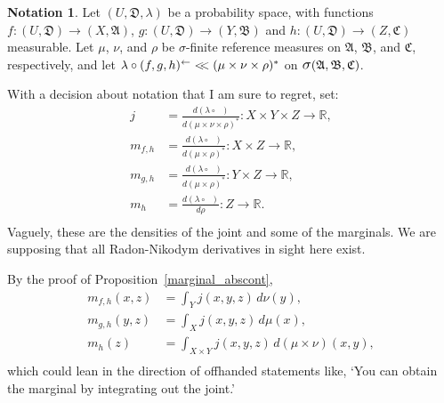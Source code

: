 \documentclass[
twoside=true,
paper=letter,
fontsize=9pt,
pagesize=auto,
leqno,
openany,
headsepline,
overfullrule,
]{scrbook}
\theoremstyle{plain}
\theoremstyle{plain}
\theoremstyle{definition}
\newtheorem{notn}[thm]{Notation}
\theoremstyle{bfnoteitalic}
\theoremstyle{bfnoteroman}
\newcommand{\sigalg}[1]{\mathfrak{#1}}
\newcommand{\sagb}{\mathop{\hbox{\large{$\sigma$}}}\nolimits}
\newcommand{\textsigma}{\hbox{\large{$\sigma$}}\kern-1pt}
\newcommand{\preimage}[1]{\mathop{#1^{\leftarrow}}}
\newcommand{\R}{\mathbb{R}}
\newcommand{\sigmaalgebra}{\sigalg{A}}
\newcommand{\sigmaalgebraii}{\sigalg{B}}
\newcommand{\sigmaalgebraiii}{\sigalg{C}}
\newcommand{\productsig}[2]{\sagb(#1,#2)}
\newcommand{\funcf}{f}
\newcommand{\funcg}{g}
\newcommand{\funch}{h}
\newcommand{\funcj}{j}
\newcommand{\function}{f}
\newcommand{\functionii}{g}
\newcommand{\functioniii}{h}
\newcommand{\measurespace}{X}
\newcommand{\measurespaceii}{Y}
\newcommand{\measurespaceiii}{Z}
\newcommand{\mspaceelt}{x}
\newcommand{\mspaceeltii}{y}
\newcommand{\mspaceeltiii}{z}
\newcommand{\abscont}{\mathrel{< \kern-3.5pt <}}
\newcommand{\measure}{\mu}
\newcommand{\measmu}{\mu}
\newcommand{\measureii}{\nu}
\newcommand{\measnu}{\nu}
\newcommand{\measlambda}{\lambda}
\newcommand{\measureiv}{\rho}
\newcommand{\measrho}{\rho}
\newcommand{\uspace}{U}%
\newcommand{\uspacesig}{\sigalg{D}}
\begin{document}
\begin{notn}\label{densities}
Let
$(\uspace,\uspacesig,\measlambda)$ be a probability space, with functions
$\funcf:(\uspace,\uspacesig)\to (\measurespace,\sigmaalgebra)$,
$\funcg:(\uspace,\uspacesig)\to (\measurespaceii,\sigmaalgebraii)$
and
$\funch:(\uspace,\uspacesig)\to (\measurespaceiii,\sigmaalgebraiii)$
measurable.
Let $\measmu$, $\measnu$, and $\measrho$ be \textsigma\hyp{}finite reference measures on
$\sigmaalgebra$, $\sigmaalgebraii$, and $\sigmaalgebraiii$, respectively, and let
$\measlambda\circ\preimage{(\funcf,\funcg,\funch)}
\abscont
(\measure\times\measureii\times\measureiv)^*$ on
$\productsig{\sigmaalgebra,\sigmaalgebraii}{\sigmaalgebraiii}$.

With a decision about notation that I am sure to regret, set:
\begin{align*}
j
& =
\frac{d (\measlambda\circ\preimage{(\funcf,\funcg,\funch)})}
{d(\measmu\times\measnu\times\measrho)^*}
:
\measurespace\times\measurespaceii\times\measurespaceiii\to\R,
\\
m_{\funcf,\funch}
& =
\frac{d (\measlambda\circ\preimage{(\funcf,\funch)} )}
{d(\measmu\times\measrho)^*}:\measurespace\times\measurespaceiii\to\R,
\\
m_{\funcg,\funch}
& =
\frac{d (\measlambda\circ\preimage{(\funcg,\funch)} )}
{d(\measmu\times\measrho)^*}:\measurespaceii\times\measurespaceiii\to\R,
\\
m_\funch
& =
\frac{d (\measlambda\circ\preimage{\funch})}
{d \measrho}:\measurespaceiii\to\R.
\\
\end{align*}
Vaguely, these are the densities of the joint and some of the marginals.
We are supposing that all Radon-Nikodym derivatives in sight here exist.

By the proof of Proposition~\ref{marginal_abscont},
\begin{align*}
m_{\function,\functioniii} (\mspaceelt,\mspaceeltiii)
& =
\int_\measurespaceii
\funcj(\mspaceelt,\mspaceeltii,\mspaceeltiii)\,
d \measnu(\mspaceeltii),
\\
m_{\functionii,\functioniii} (\mspaceeltii,\mspaceeltiii)
& =
\int_\measurespace
\funcj(\mspaceelt,\mspaceeltii,\mspaceeltiii)\,
d \measmu(\mspaceelt),
\\
m_\funch(\mspaceeltiii)
& =
\int_{\measurespace\times\measurespaceii}
\funcj(\mspaceelt,\mspaceeltii,\mspaceeltiii)\,
d(\measmu\times\measnu)(\mspaceelt,\mspaceeltii),
\\
\end{align*}
which could lean in the direction of offhanded statements like,
`You can obtain the marginal by integrating out the joint.'


\end{notn}
\end{document}
